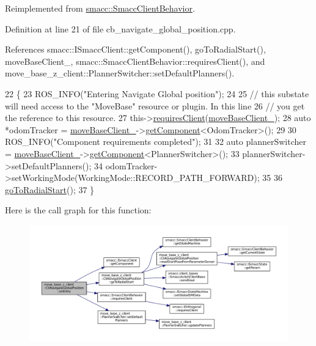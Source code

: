 Reimplemented from \hyperlink{classsmacc_1_1SmaccClientBehavior_a7962382f93987c720ad432fef55b123f}{smacc\+::\+Smacc\+Client\+Behavior}.



Definition at line 21 of file cb\+\_\+navigate\+\_\+global\+\_\+position.\+cpp.



References smacc\+::\+I\+Smacc\+Client\+::get\+Component(), go\+To\+Radial\+Start(), move\+Base\+Client\+\_\+, smacc\+::\+Smacc\+Client\+Behavior\+::requires\+Client(), and move\+\_\+base\+\_\+z\+\_\+client\+::\+Planner\+Switcher\+::set\+Default\+Planners().


\begin{DoxyCode}
22 \{
23     ROS\_INFO(\textcolor{stringliteral}{"Entering Navigate Global position"});
24 
25     \textcolor{comment}{// this substate will need access to the "MoveBase" resource or plugin. In this line}
26     \textcolor{comment}{// you get the reference to this resource.}
27     this->\hyperlink{classsmacc_1_1SmaccClientBehavior_a917f001e763a1059af337bf4e164f542}{requiresClient}(\hyperlink{classmove__base__z__client_1_1CbNavigateGlobalPosition_a418cb1a461d6f28cb34908b739298657}{moveBaseClient\_});
28     \textcolor{keyword}{auto} *odomTracker = \hyperlink{classmove__base__z__client_1_1CbNavigateGlobalPosition_a418cb1a461d6f28cb34908b739298657}{moveBaseClient\_}->\hyperlink{classsmacc_1_1ISmaccClient_adef78db601749ca63c19e74a27cb88cc}{getComponent}<OdomTracker>();
29 
30     ROS\_INFO(\textcolor{stringliteral}{"Component requirements completed"});
31 
32     \textcolor{keyword}{auto} plannerSwitcher = \hyperlink{classmove__base__z__client_1_1CbNavigateGlobalPosition_a418cb1a461d6f28cb34908b739298657}{moveBaseClient\_}->\hyperlink{classsmacc_1_1ISmaccClient_adef78db601749ca63c19e74a27cb88cc}{getComponent}<PlannerSwitcher>();
33     plannerSwitcher->setDefaultPlanners();
34     odomTracker->setWorkingMode(WorkingMode::RECORD\_PATH\_FORWARD);
35 
36     \hyperlink{classmove__base__z__client_1_1CbNavigateGlobalPosition_abc8b9437cce7b86ec7acb07c463c90e5}{goToRadialStart}();
37 \}
\end{DoxyCode}


Here is the call graph for this function\+:
\nopagebreak
\begin{figure}[H]
\begin{center}
\leavevmode
\includegraphics[width=350pt]{classmove__base__z__client_1_1CbNavigateGlobalPosition_a79f11334456f350b488f7d9a204ea3c5_cgraph}
\end{center}
\end{figure}


